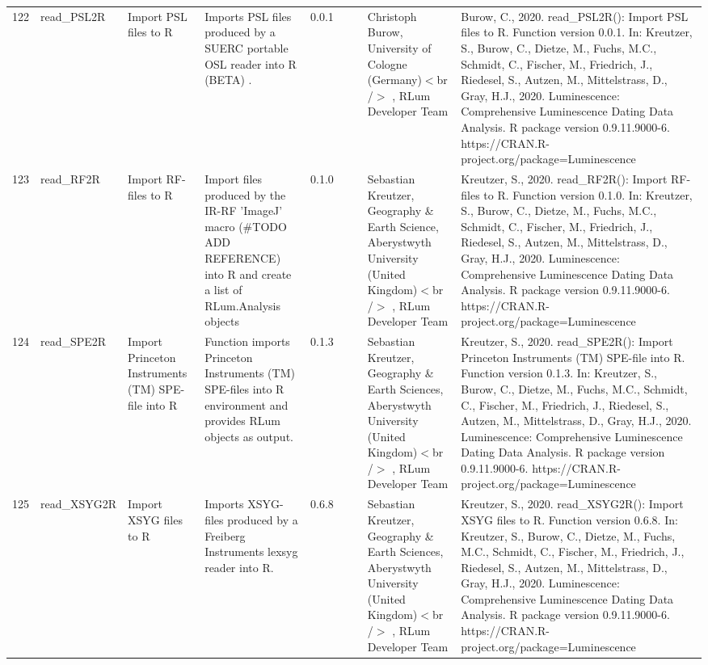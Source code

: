 \begin{table}[ht]
\begin{tabular}{rllllllll}
 \\ 
  122 & read\_PSL2R & Import PSL files to R & Imports PSL files produced by a SUERC portable OSL reader into R  (BETA) . & 0.0.1
 &  &  & Christoph Burow, University of Cologne (Germany)$<$br /$>$ , RLum Developer Team & Burow, C., 2020. read\_PSL2R(): Import PSL files to R. Function version 0.0.1. In: Kreutzer, S., Burow, C., Dietze, M., Fuchs, M.C., Schmidt, C., Fischer, M., Friedrich, J., Riedesel, S., Autzen, M., Mittelstrass, D., Gray, H.J., 2020. Luminescence: Comprehensive Luminescence Dating Data Analysis. R package version 0.9.11.9000-6. https://CRAN.R-project.org/package=Luminescence
 \\ 
  123 & read\_RF2R & Import RF-files to R & Import files produced by the IR-RF 'ImageJ' macro (\#TODO ADD REFERENCE) into R and create a list of  RLum.Analysis  objects & 0.1.0
 &  &  & Sebastian Kreutzer, Geography \& Earth Science, Aberystwyth University (United Kingdom)$<$br /$>$ , RLum Developer Team & Kreutzer, S., 2020. read\_RF2R(): Import RF-files to R. Function version 0.1.0. In: Kreutzer, S., Burow, C., Dietze, M., Fuchs, M.C., Schmidt, C., Fischer, M., Friedrich, J., Riedesel, S., Autzen, M., Mittelstrass, D., Gray, H.J., 2020. Luminescence: Comprehensive Luminescence Dating Data Analysis. R package version 0.9.11.9000-6. https://CRAN.R-project.org/package=Luminescence
 \\ 
  124 & read\_SPE2R & Import Princeton Instruments (TM) SPE-file into R & Function imports Princeton Instruments (TM) SPE-files into R environment and provides  RLum  objects as output. & 0.1.3
 &  &  & Sebastian Kreutzer, Geography \& Earth Sciences, Aberystwyth University (United Kingdom)$<$br /$>$ , RLum Developer Team & Kreutzer, S., 2020. read\_SPE2R(): Import Princeton Instruments (TM) SPE-file into R. Function version 0.1.3. In: Kreutzer, S., Burow, C., Dietze, M., Fuchs, M.C., Schmidt, C., Fischer, M., Friedrich, J., Riedesel, S., Autzen, M., Mittelstrass, D., Gray, H.J., 2020. Luminescence: Comprehensive Luminescence Dating Data Analysis. R package version 0.9.11.9000-6. https://CRAN.R-project.org/package=Luminescence
 \\ 
  125 & read\_XSYG2R & Import XSYG files to R & Imports XSYG-files produced by a Freiberg Instruments lexsyg reader into R. & 0.6.8
 &  &  & Sebastian Kreutzer, Geography \& Earth Sciences, Aberystwyth University (United Kingdom)$<$br /$>$ , RLum Developer Team & Kreutzer, S., 2020. read\_XSYG2R(): Import XSYG files to R. Function version 0.6.8. In: Kreutzer, S., Burow, C., Dietze, M., Fuchs, M.C., Schmidt, C., Fischer, M., Friedrich, J., Riedesel, S., Autzen, M., Mittelstrass, D., Gray, H.J., 2020. Luminescence: Comprehensive Luminescence Dating Data Analysis. R package version 0.9.11.9000-6. https://CRAN.R-project.org/package=Luminescence

\end{tabular}
\end{table}
